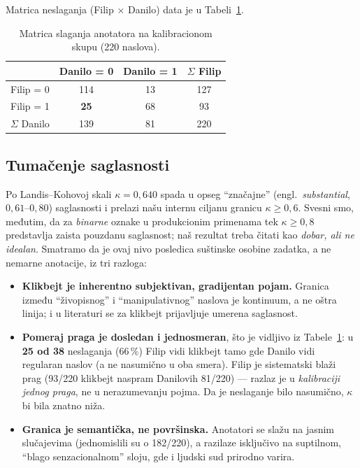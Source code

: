 \documentclass[11pt,a4paper]{article}
\begin{document}
Matrica neslaganja (Filip $\times$ Danilo) data je u Tabeli~\ref{tab:konfuzija}.

\begin{table}[H]\centering
\caption{Matrica slaganja anotatora na kalibracionom skupu (220 naslova).}\label{tab:konfuzija}
\begin{tabular}{lccc}
\toprule
 & Danilo = 0 & Danilo = 1 & $\Sigma$ Filip \\
\midrule
Filip = 0 & 114 & 13 & 127 \\
Filip = 1 & \textbf{25} & 68 & 93 \\
$\Sigma$ Danilo & 139 & 81 & 220 \\
\bottomrule
\end{tabular}
\end{table}

\subsection{Tumačenje saglasnosti}\label{sec:kappa}
Po Landis--Kohovoj skali $\kappa = 0{,}640$ spada u opseg \enquote{značajne}
(engl.\ \emph{substantial}, $0{,}61$--$0{,}80$) saglasnosti i prelazi našu internu
ciljanu granicu $\kappa \ge 0{,}6$. Svesni smo, međutim, da za \emph{binarne} oznake
u produkcionim primenama tek $\kappa \ge 0{,}8$ predstavlja zaista pouzdanu
saglasnost; naš rezultat treba čitati kao \emph{dobar, ali ne idealan}. Smatramo da
je ovaj nivo posledica suštinske osobine zadatka, a ne nemarne anotacije, iz tri
razloga:
\begin{itemize}
  \item \textbf{Klikbejt je inherentno subjektivan, gradijentan pojam.} Granica
    između \enquote{živopisnog} i \enquote{manipulativnog} naslova je kontinuum, a ne
    oštra linija; i u literaturi se za klikbejt prijavljuje umerena saglasnost.
  \item \textbf{Pomeraj praga je dosledan i jednosmeran}, što je vidljivo iz
    Tabele~\ref{tab:konfuzija}: u \textbf{25 od 38} neslaganja (66\,\%) Filip vidi
    klikbejt tamo gde Danilo vidi regularan naslov (a ne nasumično u oba smera).
    Filip je sistematski blaži prag (93/220 klikbejt naspram Danilovih 81/220) ---
    razlaz je u \emph{kalibraciji jednog praga}, ne u nerazumevanju pojma. Da je
    neslaganje bilo nasumično, $\kappa$ bi bila znatno niža.
  \item \textbf{Granica je semantička, ne površinska.} Anotatori se slažu na jasnim
    slučajevima (jednomislili su o 182/220), a razilaze isključivo na suptilnom,
    \enquote{blago senzacionalnom} sloju, gde i ljudski sud prirodno varira.
\end{itemize}
\end{document}
